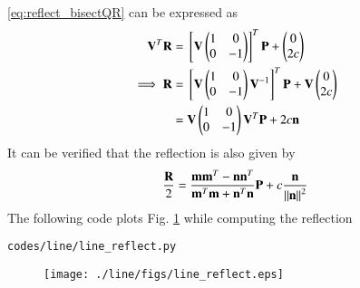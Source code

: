 \begin{enumerate}[label=\arabic*.,ref=\thesubsection.\theenumi]
\eqref{eq:reflect_bisectQR} can be expressed as
%
\begin{align}
\label{eq:reflect_}
\mathbf{V}^T\mathbf{R} &=  {}\left[\mathbf{V}\begin{pmatrix}1 & 0 \\ 0 & -1\end{pmatrix}\right]^T\mathbf{P}+\begin{pmatrix}0 \\ 2c\end{pmatrix}
\\
\implies \mathbf{R} &= {}\left[\mathbf{V}\begin{pmatrix}1 & 0 \\ 0 & -1\end{pmatrix}\mathbf{V}^{-1}\right]^T\mathbf{P}+ \mathbf{V}\begin{pmatrix}0 \\ 2c\end{pmatrix}
\\
 &=\mathbf{V}\begin{pmatrix}1 & 0 \\ 0 & -1\end{pmatrix}\mathbf{V}^T \mathbf{P}+2c \mathbf{n}
\end{align}
It can be verified that 
the reflection is also given by
\begin{align}
\frac{\mathbf{R}}{2} = \frac{\mathbf{m}\mathbf{m}^T-\mathbf{n}\mathbf{n}^T}{\mathbf{m}^T\mathbf{m}+\mathbf{n}^T\mathbf{n}}\mathbf{P} + c 
\frac{\mathbf{n}}{\left\lVert\mathbf{n}\right\rVert^2}
\end{align}
%
The following code plots Fig. \ref{fig:line_reflect} while computing the reflection
%
\begin{lstlisting}
codes/line/line_reflect.py
\end{lstlisting}
%
\begin{figure}[!ht]
\texttt{[image: ./line/figs/line\_reflect.eps]}
\caption{}
\label{fig:line_reflect}
\end{figure}
%


\end{enumerate}
